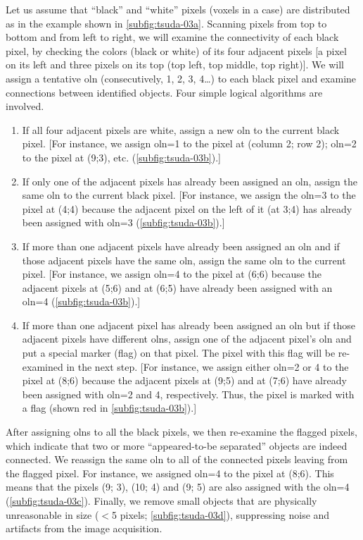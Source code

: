 Let us assume that ``black'' and ``white'' pixels (voxels in a \threed case) are distributed as in the example shown in \autoref{subfig:tsuda-03a}. Scanning pixels from top to bottom and from left to right, we will examine the connectivity of each black pixel, by checking the colors (black or white) of its four adjacent pixels [a pixel on its left and three pixels on its top (top left, top middle, top right)]. We will assign a tentative \acf{oln} (consecutively, 1, 2, 3, 4\ldots) to each black pixel and examine connections between identified objects. Four simple logical algorithms are involved.
\begin{enumerate}
	\item If all four adjacent pixels are white, assign a new \ac{oln} to the current black pixel. [For instance, we assign \ac{oln}=1 to the pixel at (column 2; row 2); \ac{oln}=2 to the pixel at (9;3), etc. (\autoref{subfig:tsuda-03b}).]
	\item If only one of the adjacent pixels has already been assigned an \ac{oln}, assign the same \ac{oln} to the current black pixel. [For instance, we assign the \ac{oln}=3 to the pixel at (4;4) because the adjacent pixel on the left of it (at 3;4) has already been assigned with \ac{oln}=3 (\autoref{subfig:tsuda-03b}).]
	\item If more than one adjacent pixels have already been assigned an \ac{oln} and if those adjacent pixels have the same \ac{oln}, assign the same \ac{oln} to the current pixel. [For instance, we assign \ac{oln}=4 to the pixel at (6;6) because the adjacent pixels at (5;6) and at (6;5) have already been assigned with an \ac{oln}=4 (\autoref{subfig:tsuda-03b}).]
	\item If more than one adjacent pixel has already been assigned an \ac{oln} but if those adjacent pixels have different \acp{oln}, assign one of the adjacent pixel's \ac{oln} and put a special marker (flag) on that pixel. The pixel with this flag will be re-examined in the next step. [For instance, we assign either \ac{oln}=2 or 4 to the pixel at (8;6) because the adjacent pixels at (9;5) and at (7;6) have already been assigned with \ac{oln}=2 and 4, respectively. Thus, the pixel is marked with a flag (shown red in \autoref{subfig:tsuda-03b}).]
\end{enumerate}
After assigning \acp{oln} to all the black pixels, we then re-examine the flagged pixels, which indicate that two or more ``appeared-to-be separated'' objects are indeed connected. We reassign the same \ac{oln} to all of the connected pixels leaving from the flagged pixel. For instance, we assigned \ac{oln}=4 to the pixel at (8;6). This means that the pixels (9; 3), (10; 4) and (9; 5) are also assigned with the \ac{oln}=4 (\autoref{subfig:tsuda-03c}). Finally, we remove small objects that are physically unreasonable in size ($<$5 pixels; \autoref{subfig:tsuda-03d}), suppressing noise and artifacts from the image acquisition.

